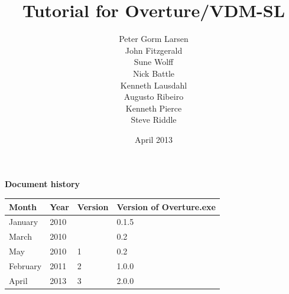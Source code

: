 \documentclass{overturerepsec}
\begin{document}
 
\title{Tutorial for Overture/VDM-SL}
\author{Peter Gorm Larsen\\
        John Fitzgerald \\
        Sune Wolff\\
        Nick Battle\\
        Kenneth Lausdahl\\
        Augusto Ribeiro\\
        Kenneth Pierce\\
        Steve Riddle}

\date{April 2013}

{}     

\maketitle

{\textbf{Document history}}

\begin{tabular}{|l|l|l|l|}\hline
Month   & Year & Version & Version of Overture.exe \\ \hline
January & 2010 &  & 0.1.5 \\ \hline
March   & 2010 &  & 0.2   \\ \hline
May     & 2010 & 1& 0.2   \\ \hline
February& 2011 & 2& 1.0.0 \\ \hline
April   & 2013 & 3& 2.0.0 \\ \hline
\end{tabular}

\tableofcontents
\newpage
% 




\setcounter{page}{1}
\addtocounter{chapter}{2}



\appendix






\end{document}
